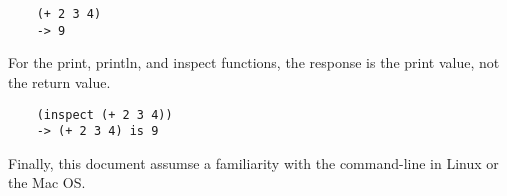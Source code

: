 \documentclass{book}
\begin{document}
\begin{verbatim}
    (+ 2 3 4)
    -> 9
\end{verbatim}

For the print, println, and inspect functions, the response
is the print value, not the return value.

\begin{verbatim}
    (inspect (+ 2 3 4))
    -> (+ 2 3 4) is 9
\end{verbatim}

Finally, this document assumse a familiarity with the command-line in
Linux or the Mac OS.






%
%
%
%
%
%
%
%
%
%
%
%
%
%
%
%
%
%
\end{document}
